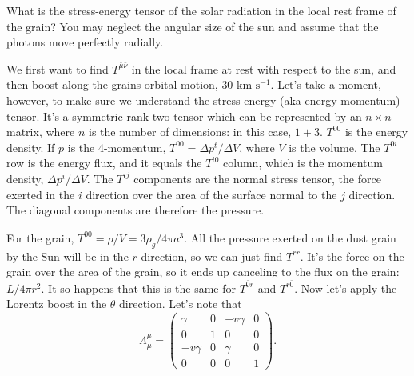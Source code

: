 \documentclass[11pt,largemargins]{homework}
\begin{document}
\begin{alphaparts}
\questionpart
What is the stress-energy tensor of the solar radiation in the local rest frame of the grain? You may neglect the angular size of the sun and assume that the photons move perfectly radially.  

We first want to find $T^{\bar{\mu}\bar{\nu}}$ in the local frame at rest with respect to the sun, and then boost along the grains orbital motion, $30 \mbox{ km} \mbox{ s}^{-1}$.  Let's take a moment, however, to make sure we understand the stress-energy (aka energy-momentum) tensor.  It's a symmetric rank two tensor which can be represented by an $n \times n$ matrix, where $n$ is the number of dimensions: in this case, $1 + 3$. $T^{00}$ is the energy density.  If $p$ is the 4-momentum, $T^{00} = \Delta p^{t} / \Delta V$, where $V$ is the volume.  The $T^{0i}$ row is the energy flux, and it equals the $T^{i0}$ column, which is the momentum density, $\Delta p^{i} /\Delta V$. The $T^{ij}$ components are the normal stress tensor, the force exerted in the $i$ direction over the area of the surface normal to the $j$ direction.  The diagonal components are therefore the pressure.  

For the grain, $T^{\bar{0}\bar{0}} = \rho / V = 3\rho_{g} / 4 \pi a^3$. All the pressure exerted on the dust grain by the Sun will be in the $r$ direction, so we can just find $T^{\bar{r}\bar{r}}$. It's the force on the grain over the area of the grain, so it ends up canceling to the flux on the grain: $L/4 \pi r^2$. It so happens that this is the same for $T^{\bar{0}\bar{r}}$ and $T^{\bar{r}\bar{0}}$.  Now let's apply the Lorentz boost in the $\theta$ direction.  Let's note that 
$$\Lambda_{\bar{\mu}}^{\mu} = \begin{pmatrix} \gamma & 0 & -v\gamma & 0 \\ 0 & 1 & 0 & 0 \\ -v \gamma & 0 & \gamma & 0 \\ 0 & 0 & 0 & 1 \end{pmatrix}. $$


\end{alphaparts}
\end{document}

